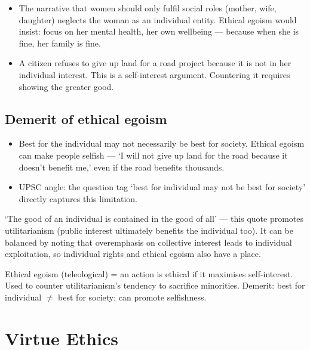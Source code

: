 \begin{ExampleBox}
\begin{itemize}
\item The narrative that women should only fulfil social roles (mother, wife, daughter) neglects the woman as an individual entity. Ethical egoism would insist: focus on her mental health, her own wellbeing --- because when she is fine, her family is fine.
\item A citizen refuses to give up land for a road project because it is not in her individual interest. This is a self-interest argument. Countering it requires showing the greater good.
\end{itemize}
\end{ExampleBox}

\subsection*{Demerit of ethical egoism}
\begin{CriticalPoint}
\begin{itemize}
\item Best for the individual may not necessarily be best for society. Ethical egoism can make people selfish --- `I will not give up land for the road because it doesn't benefit me,' even if the road benefits thousands.
\item UPSC angle: the question tag `best for individual may not be best for society' directly captures this limitation.
\end{itemize}
\end{CriticalPoint}

\begin{PYQLink}
`The good of an individual is contained in the good of all' --- this quote promotes utilitarianism (public interest ultimately benefits the individual too). It can be balanced by noting that overemphasis on collective interest leads to individual exploitation, so individual rights and ethical egoism also have a place.
\end{PYQLink}

\begin{QuickRevision}
Ethical egoism (teleological) = an action is ethical if it maximises self-interest. Used to counter utilitarianism's tendency to sacrifice minorities. Demerit: best for individual $\neq$ best for society; can promote selfishness.
\end{QuickRevision}

\section{Virtue Ethics}

